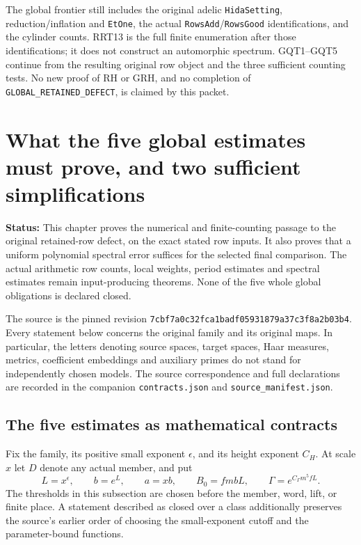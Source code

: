 \documentclass[11pt,a4paper]{article}
\numberwithin{equation}{section}
\theoremstyle{remark}\newtheorem{remark}[theorem]{Remark}
\newcommand{\status}[1]{\textbf{Status:} #1}
\begin{document}
The global frontier still includes the original adelic
\texttt{Hida\allowbreak Setting}, reduction/inflation and \texttt{Et\allowbreak One},
the actual \texttt{Rows\allowbreak Add}/\texttt{Rows\allowbreak Good} identifications,
and the cylinder counts.  RRT13 is the full finite enumeration
after those identifications; it does not construct an
automorphic spectrum.  GQT1--GQT5 continue from the resulting
original row object and the three sufficient counting tests.
No new proof of RH or GRH, and no completion of
\texttt{GLOBAL\_\allowbreak RETAINED\_\allowbreak DEFECT}, is claimed by this packet.


\section{What the five global estimates must prove, and two sufficient simplifications}
\label{sec:global-quantitative-v042}

\status{This chapter proves the numerical and finite-counting passage to
the original retained-row defect, on the exact stated row inputs. It
also proves that a uniform polynomial spectral error suffices for the
selected final comparison. The actual arithmetic row counts, local
weights, period estimates and spectral estimates remain input-producing
theorems. None of the five whole global obligations is declared closed.}

The source is the pinned revision
\texttt{7cbf7a0c32fca1badf05931879a37c3f8a2b03b4}.
Every statement below concerns the original family and its original
maps. In particular, the letters denoting source spaces, target spaces,
Haar measures, metrics, coefficient embeddings and auxiliary primes
do not stand for independently chosen models. The source correspondence
and full declarations are recorded in the companion
\texttt{contracts.\allowbreak json} and \texttt{source\_\allowbreak manifest.\allowbreak json}.

\subsection{The five estimates as mathematical contracts}

Fix the family, its positive small exponent $\epsilon$, and its height
exponent $C_H$. At scale $x$ let $D$ denote any actual member, and put
\[
 L=x^\epsilon,\qquad b=e^L,\qquad a=xb,\qquad
 B_0=fmbL,\qquad \Gamma=e^{C_\Gamma m^5fL}.
\]
The thresholds in this subsection are chosen before the member, word,
lift, or finite place. A statement described as closed over a class
additionally preserves the source's earlier order of choosing the
small-exponent cutoff and the parameter-bound functions.
\end{document}
